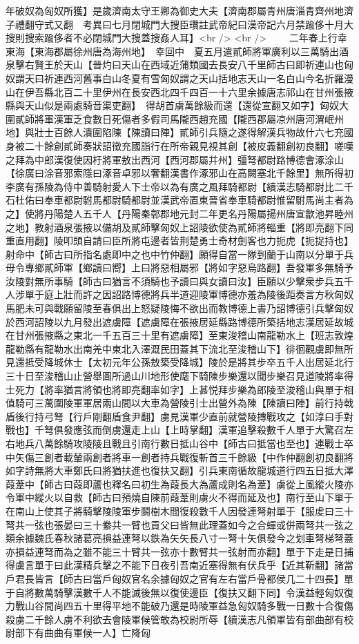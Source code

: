 年破奴為匈奴所獲】是歲濟南太守王卿為御史大夫【濟南郡屬青州唐淄青齊州地濟子禮翻守式又翻　考異曰七月閉城門大搜臣瓚註武帝紀曰漢帝記六月禁踰侈十月大搜則搜索踰侈者不必閉城門大搜蓋搜姦人耳】<br />
<br />
　　二年春上行幸東海【東海郡屬徐州唐為海州地】　幸回中　夏五月遣貳師將軍廣利以三萬騎出酒泉擊右賢王於天山【晉灼曰天山在西域近蒲類國去長安八千里師古曰即祈連山也匈奴謂天曰祈連西河舊事白山冬夏有雪匈奴謂之天山括地志天山一名白山今名折羅漫山在伊吾縣北百二十里伊州在長安西北四千四百一十六里余據唐志祁山在甘州張掖縣與天山似是兩處騎音渠吏翻】　得胡首虜萬餘級而還【還從宣翻又如字】匈奴大圍貳師將軍漢軍乏食數日死傷者多假司馬隴西趙充國【隴西郡屬凉州唐河渭岷州地】與壯士百餘人潰圍陷陳【陳讀曰陣】貳師引兵隨之遂得解漢兵物故什六七充國身被二十餘創貳師奏狀詔徵充國詣行在所帝親見視其創【被皮義翻創初良翻】嗟嘆之拜為中郎漢復使因杅將軍敖出西河【西河郡屬并州】彊弩都尉路博德會涿涂山【徐廣曰涂音邪索隱曰涿音卓邪以奢翻漢書作涿邪山在高闕塞北千餘里】無所得初李廣有孫陵為侍中善騎射愛人下士帝以為有廣之風拜騎都尉【續漢志騎都尉比二千石杜佑曰奉車都尉駙馬都尉騎都尉並漢武帝置東晉省奉車騎都尉惟留駙馬尚主者為之】使將丹陽楚人五千人【丹陽秦鄣郡地元封二年更名丹陽屬揚州唐宣歙池昇睦州之地】教射酒泉張掖以備胡及貳師擊匈奴上詔陵欲使為貳師將輜重【將即亮翻下同重直用翻】陵叩頭自請曰臣所將屯邊者皆荆楚勇士奇材劍客也力扼虎【扼捉持也】射命中【師古曰所指名處即中之也中竹仲翻】願得自當一隊到蘭于山南以分單于兵毋令專鄉貳師軍【鄉讀曰嚮】上曰將惡相屬邪【將如字惡烏路翻】吾發軍多無騎予汝陵對無所事騎【師古曰猶言不須騎也予讀曰與女讀曰汝】臣願以少擊衆步兵五千人涉單于庭上壯而許之因詔路博德將兵半道迎陵軍博德亦羞為陵後距奏言方秋匈奴馬肥未可與戰願留陵至春俱出上怒疑陵悔不欲出而教博德上書乃詔博德引兵擊匈奴於西河詔陵以九月發出遮虜障【遮虜障在張掖居延縣路博德所築括地志漢居延故城在甘州張掖縣之東北一千五百三十里有遮虜障】至東浚稽山南龍勒水上【班志敦煌龍勒縣有龍勒水出南羌中東北入澤溉民田蓋其下流北至浚稽山下】徘徊觀虜即無所見還抵受降城休士【太初元年公孫敖築受降城】陵於是將其步卒五千人出居延北行三十日至浚稽山止營舉圖所過山川地形使麾下騎陳步樂還以聞步樂召見道陵將率得士死力【將率猶言將領也將即亮翻率如字】上甚悦拜步樂為郎陵至浚稽山與單于相值騎可三萬圍陵軍軍居兩山間以大車為營陵引士出營外為陳【陳讀曰陣】前行持戟盾後行持弓弩【行戶剛翻盾食尹翻】虜見漢軍少直前就營陵摶戰攻之【如淳曰手對戰也】千弩俱發應弦而倒虜還走上山【上時掌翻】漢軍追擊殺數千人單于大驚召左右地兵八萬餘騎攻陵陵且戰且引南行數日抵山谷中【師古曰抵當也至也】連戰士卒中矢傷三創者載輦兩創者將車一創者持兵戰復斬首三千餘級【中作仲翻創初良翻將如字詩無將大車鄭氏曰將猶扶進也復扶又翻】引兵東南循故龍城道行四五日抵大澤葭葦中【師古曰葭即蘆也釋名曰初生為葭長大為蘆成則名為葦】虜從上風縱火陵亦令軍中縱火以自救【師古曰預燒自陳前葭葦則虜火不得而延及也】南行至山下單于在南山上使其子將騎擊陵陵軍步鬬樹木間復殺數千人因發連弩射單于【服䖍曰三十弩共一弦也張晏曰三十絭共一臂也貢父曰皆無此理蓋如今之合蟬或併兩弩共一弦之類余據魏氏春秋諸葛亮損益連弩以鉄為矢矢長八寸一弩十矢俱發今之划車弩梯弩蓋亦損益連弩而為之雖不能三十臂共一弦亦十數臂共一弦射而亦翻】單于下走是日捕得虜言單于曰此漢精兵擊之不能下日夜引吾南近塞得無有伏兵乎【近其靳翻】諸當戶君長皆言【師古曰當戶匈奴官名余據匈奴之官有左右當戶骨都侯几二十四長】單于自將數萬騎擊漢數千人不能滅後無以復使邊臣【復扶又翻下同】令漢益輕匈奴復力戰山谷間尚四五十里得平地不能破乃還是時陵軍益急匈奴騎多戰一日數十合復傷殺虜二千餘人虜不利欲去會陵軍候管敢為校尉所辱【續漢志凡領軍皆有部曲部有校尉部下有曲曲有軍候一人】亡降匈